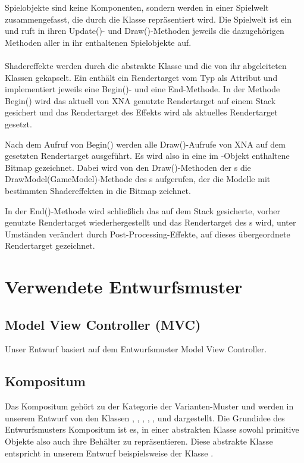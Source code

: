 Spielobjekte sind keine Komponenten, sondern werden in einer Spielwelt zusammengefasst, die durch die Klasse  repräsentiert wird. Die Spielwelt ist ein  und ruft in ihren Update()- und Draw()-Methoden jeweils die dazugehörigen Methoden aller in ihr enthaltenen Spielobjekte auf.
\\\\
Shadereffekte werden durch die abstrakte Klasse  und die von ihr abgeleiteten Klassen gekapselt. Ein  enthält ein Rendertarget vom Typ  als Attribut und implementiert jeweils eine Begin()- und eine End-Methode. In der Methode Begin() wird das aktuell von XNA genutzte Rendertarget auf einem Stack gesichert und das Rendertarget des Effekts wird als aktuelles Rendertarget gesetzt.

Nach dem Aufruf von Begin() werden alle Draw()-Aufrufe von XNA auf dem gesetzten Rendertarget ausgeführt. Es wird also in eine im -Objekt enthaltene Bitmap gezeichnet. Dabei wird von den Draw()-Methoden der s die DrawModel(GameModel)-Methode des s aufgerufen, der die Modelle mit bestimmten Shadereffekten in die Bitmap zeichnet.

In der End()-Methode wird schließlich das auf dem Stack gesicherte, vorher genutzte Rendertarget wiederhergestellt und das Rendertarget des s wird, unter Umständen verändert durch Post-Processing-Effekte, auf dieses übergeordnete Rendertarget gezeichnet.


\section{Verwendete Entwurfsmuster}

\subsection{Model View Controller (MVC)}
Unser Entwurf basiert auf dem Entwurfsmuster Model View Controller.

\subsection{Kompositum}
Das Kompositum gehört zu der Kategorie der Varianten-Muster und werden in unserem Entwurf von den Klassen , , , , ,  und  dargestellt.
Die Grundidee des Entwurfsmusters Kompositum ist es, in einer abstrakten Klasse sowohl primitive Objekte also auch ihre Behälter zu repräsentieren.
Diese abstrakte Klasse entspricht in unserem Entwurf beispielsweise der Klasse .

